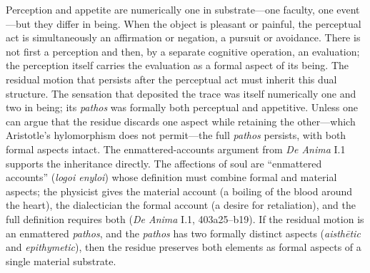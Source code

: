 \documentclass{article}
\begin{document}
Perception and appetite are numerically one in substrate---one faculty, one event---but they differ in being. When the object is pleasant or painful, the perceptual act is simultaneously an affirmation or negation, a pursuit or avoidance. There is not first a perception and then, by a separate cognitive operation, an evaluation; the perception itself carries the evaluation as a formal aspect of its being. The residual motion that persists after the perceptual act must inherit this dual structure. The sensation that deposited the trace was itself numerically one and two in being; its \textit{pathos} was formally both perceptual and appetitive. Unless one can argue that the residue discards one aspect while retaining the other---which Aristotle's hylomorphism does not permit---the full \textit{pathos} persists, with both formal aspects intact. The enmattered-accounts argument from \textit{De Anima} I.1 supports the inheritance directly. The affections of soul are ``enmattered accounts'' (\textit{logoi enyloi}) whose definition must combine formal and material aspects; the physicist gives the material account (a boiling of the blood around the heart), the dialectician the formal account (a desire for retaliation), and the full definition requires both (\textit{De Anima} I.1, 403a25--b19). If the residual motion is an enmattered \textit{pathos}, and the \textit{pathos} has two formally distinct aspects (\textit{aisthētic} and \textit{epithymetic}), then the residue preserves both elements as formal aspects of a single material substrate.
\end{document}

